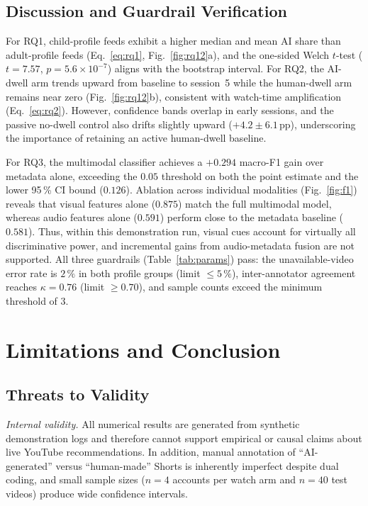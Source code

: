 \documentclass[conference]{IEEEtran}
\begin{document}
\subsection{Discussion and Guardrail Verification}
For RQ1, child-profile feeds exhibit a higher median and mean AI share than adult-profile feeds (Eq.~\eqref{eq:rq1}, Fig.~\ref{fig:rq12}a), and the one-sided Welch $t$-test ($t=7.57$, $p=5.6\times10^{-7}$) aligns with the bootstrap interval. For RQ2, the AI-dwell arm trends upward from baseline to session~5 while the human-dwell arm remains near zero (Fig.~\ref{fig:rq12}b), consistent with watch-time amplification (Eq.~\eqref{eq:rq2}). However, confidence bands overlap in early sessions, and the passive no-dwell control also drifts slightly upward ($+4.2\pm 6.1$\,pp), underscoring the importance of retaining an active human-dwell baseline.

For RQ3, the multimodal classifier achieves a $+0.294$ macro-F1 gain over metadata alone, exceeding the $0.05$ threshold on both the point estimate and the lower 95\,\% CI bound ($0.126$). Ablation across individual modalities (Fig.~\ref{fig:f1}) reveals that visual features alone ($0.875$) match the full multimodal model, whereas audio features alone ($0.591$) perform close to the metadata baseline ($0.581$). Thus, within this demonstration run, visual cues account for virtually all discriminative power, and incremental gains from audio-metadata fusion are not supported. All three guardrails (Table~\ref{tab:params}) pass: the unavailable-video error rate is $2\,\%$ in both profile groups (limit $\le 5\,\%$), inter-annotator agreement reaches $\kappa=0.76$ (limit $\ge 0.70$), and sample counts exceed the minimum threshold of $3$.

\section{Limitations and Conclusion}\label{sec:limits}
\subsection{Threats to Validity}
\emph{Internal validity.} All numerical results are generated from synthetic demonstration logs and therefore cannot support empirical or causal claims about live YouTube recommendations. In addition, manual annotation of ``AI-generated'' versus ``human-made'' Shorts is inherently imperfect despite dual coding, and small sample sizes ($n=4$ accounts per watch arm and $n=40$ test videos) produce wide confidence intervals.
\end{document}

